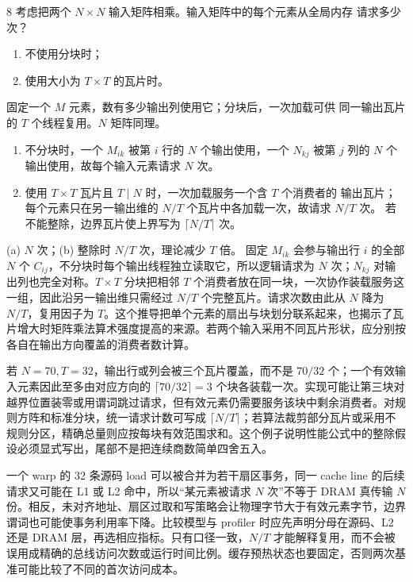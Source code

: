 \begin{solutionexercise}{8}
\problemheading 考虑把两个 $N\times N$ 输入矩阵相乘。输入矩阵中的每个元素从全局内存
请求多少次？
\begin{enumerate}[label=\alph*.,leftmargin=2.2em]
  \item 不使用分块时；
  \item 使用大小为 $T\times T$ 的瓦片时。
\end{enumerate}

\approachheading 固定一个 $M$ 元素，数有多少输出列使用它；分块后，一次加载可供
同一输出瓦片的 $T$ 个线程复用。$N$ 矩阵同理。

\answerheading
\begin{enumerate}[label=\alph*.,leftmargin=2.2em]
\item 不分块时，一个 $M_{ik}$ 被第 $i$ 行的 $N$ 个输出使用，一个 $N_{kj}$ 被第
$j$ 列的 $N$ 个输出使用，故每个输入元素请求 $N$ 次。
\item 使用 $T\times T$ 瓦片且 $T\mid N$ 时，一次加载服务一个含 $T$ 个消费者的
输出瓦片；每个元素只在另一输出维的 $N/T$ 个瓦片中各加载一次，故请求 $N/T$ 次。
若不能整除，边界瓦片使上界写为 $\lceil N/T\rceil$ 次。
\end{enumerate}

\conclusionheading (a) $N$ 次；(b) 整除时 $N/T$ 次，理论减少 $T$ 倍。
\discussionheading
{}
固定 $M_{ik}$ 会参与输出行 $i$ 的全部 $N$ 个 $C_{ij}$，不分块时每个输出线程独立读取它，所以逻辑请求为 $N$ 次；$N_{kj}$ 对输出列也完全对称。$T\times T$ 分块把相邻 $T$ 个消费者放在同一块，一次协作装载服务这一组，因此沿另一输出维只需经过 $N/T$ 个完整瓦片。请求次数由此从 $N$ 降为 $N/T$，复用因子为 $T$。这个推导把单个元素的扇出与块划分联系起来，也揭示了瓦片增大时矩阵乘法算术强度提高的来源。若两个输入采用不同瓦片形状，应分别按各自在输出方向覆盖的消费者数计算。

若 $N=70,T=32$，输出行或列会被三个瓦片覆盖，而不是 $70/32$ 个；一个有效输入元素因此至多由对应方向的 $\lceil70/32\rceil=3$ 个块各装载一次。实现可能让第三块对越界位置装零或用谓词跳过请求，但有效元素仍需要服务该块中剩余消费者。对规则方阵和标准分块，统一请求计数可写成 $\lceil N/T\rceil$；若算法裁剪部分瓦片或采用不规则分区，精确总量则应按每块有效范围求和。这个例子说明性能公式中的整除假设必须显式写出，尾部不是把连续商数简单四舍五入。

一个 warp 的 32 条源码 load 可以被合并为若干扇区事务，同一 cache line 的后续请求又可能在 L1 或 L2 命中，所以“某元素被请求 $N$ 次”不等于 DRAM 真传输 $N$ 份。相反，未对齐地址、扇区过取和写策略会让物理字节大于有效元素字节，边界谓词也可能使事务利用率下降。比较模型与 profiler 时应先声明分母在源码、L2 还是 DRAM 层，再选相应指标。只有口径一致，$N/T$ 才能解释复用，而不会被误用成精确的总线访问次数或运行时间比例。缓存预热状态也要固定，否则两次基准可能比较了不同的首次访问成本。


\end{solutionexercise}
